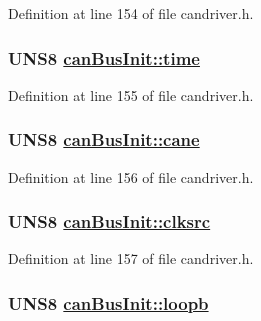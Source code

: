 Definition at line 154 of file candriver.h.\hypertarget{structcanBusInit_85a64136e89c9106116e635487c8dbf8}{
\subsubsection[time]{\setlength{\rightskip}{0pt plus 5cm}UNS8 \hyperlink{structcanBusInit_85a64136e89c9106116e635487c8dbf8}{can\-Bus\-Init::time}}}
\label{structcanBusInit_85a64136e89c9106116e635487c8dbf8}




Definition at line 155 of file candriver.h.\hypertarget{structcanBusInit_89208e27db0d71c7b4c34b396d8e4494}{
\subsubsection[cane]{\setlength{\rightskip}{0pt plus 5cm}UNS8 \hyperlink{structcanBusInit_89208e27db0d71c7b4c34b396d8e4494}{can\-Bus\-Init::cane}}}
\label{structcanBusInit_89208e27db0d71c7b4c34b396d8e4494}




Definition at line 156 of file candriver.h.\hypertarget{structcanBusInit_15fa5be003dd5961e7926d75bd405058}{
\subsubsection[clksrc]{\setlength{\rightskip}{0pt plus 5cm}UNS8 \hyperlink{structcanBusInit_15fa5be003dd5961e7926d75bd405058}{can\-Bus\-Init::clksrc}}}
\label{structcanBusInit_15fa5be003dd5961e7926d75bd405058}




Definition at line 157 of file candriver.h.\hypertarget{structcanBusInit_b12f39cd4161fdc5ad130b4bb8e4a484}{
\subsubsection[loopb]{\setlength{\rightskip}{0pt plus 5cm}UNS8 \hyperlink{structcanBusInit_b12f39cd4161fdc5ad130b4bb8e4a484}{can\-Bus\-Init::loopb}}}
\label{structcanBusInit_b12f39cd4161fdc5ad130b4bb8e4a484}




